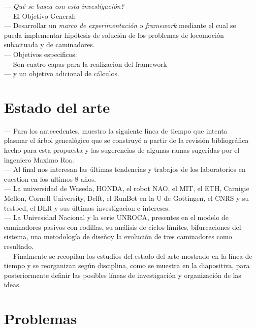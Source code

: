 \documentclass[10pt,letterpaper,oneside,onecolumn]{article}
\newcommand{\anext}{\quad[\quad$\rhd$\quad]}
\begin{document}
{  --- \emph{Qu\'e se busca con esta investigaci\'on?}\anext\\
  --- El Objetivo General:\\
  --- Desarrollar un \emph{marco de experimentaci\'on} o \emph{framework} mediante el cual se pueda implementar hip\'otesis de soluci\'on de los problemas de locomoci\'on subactuada y de caminadores.\anext\\
  --- Objetivos especificos:\anext\\
  --- Son cuatro capas para la realizacion del framework\anext\\
  --- y un objetivo adicional de c\'alculos.\anext\\

  \section{Estado del arte}
  \label{sec:arte}

  --- Para los antecedentes\anext, muestro la siguiente l\'inea de tiempo que intenta plasmar el \'arbol geneal\'ogico que se construy\'o a partir de la revisi\'on bibliogr\'afica hecho para esta propuesta y las sugerencias de algunas ramas sugeridas por el ingeniero Maximo Roa.\\
  --- Al final nos interesan las \'ultimas tendencias y trabajos de los laboratorios en cuestion en los ultimos 8 a\~nos.\anext\\
  --- La universidad de Waseda\anext, HONDA\anext, el robot NAO\anext, el MIT\anext, el ETH\anext, Carnigie Mellon, Cornell University\anext, Delft\anext, el RunBot en la U de Gottingen\anext, el CNRS y su testbed\anext, el DLR y sus \'ultimas investigacion e intereses\anext.\\
  --- La Univesidad Nacional y la serie UNROCA\anext, presentes en el modelo de caminadores pasivos con rodillas\anext, su an\'alisis de ciclos l\'imites\anext, bifurcaciones del sistema\anext, una metodolog\'ia de dise\~no\anext y la evoluci\'on de tres caminadores como resultado\anext.\\
  --- Finalmente se recopilan los estudios del estado del arte mostrado en la l\'inea de tiempo y se reorganizan seg\'un disciplina, como se muestra en la diapositiva, para posteriormente definir las posibles l\'ineas de investigaci\'on y organizaci\'on de las ideas.\anext\\

  \section{Problemas}
  \label{problemas}

}
\end{document}
